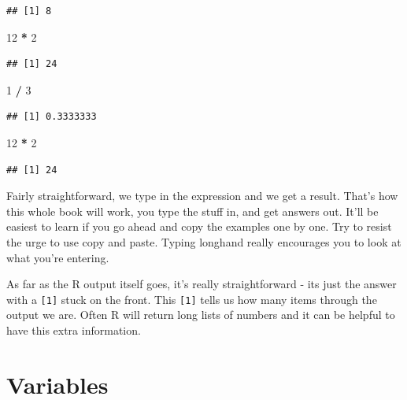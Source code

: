 \documentclass[
]{book}
\newenvironment{Shaded}{\begin{snugshade}}{\end{snugshade}}
\newcommand{\DecValTok}[1]{\textcolor[rgb]{0.00,0.00,0.81}{#1}}
\newcommand{\OperatorTok}[1]{\textcolor[rgb]{0.81,0.36,0.00}{\textbf{#1}}}
\newcommand{\StringTok}[1]{\textcolor[rgb]{0.31,0.60,0.02}{#1}}
\begin{document}
\begin{verbatim}
## [1] 8
\end{verbatim}

\begin{Shaded}
\begin{Highlighting}[]
 \DecValTok{12} \OperatorTok{*}\StringTok{ }\DecValTok{2}
\end{Highlighting}
\end{Shaded}

\begin{verbatim}
## [1] 24
\end{verbatim}

\begin{Shaded}
\begin{Highlighting}[]
 \DecValTok{1} \OperatorTok{/}\StringTok{ }\DecValTok{3}
\end{Highlighting}
\end{Shaded}

\begin{verbatim}
## [1] 0.3333333
\end{verbatim}

\begin{Shaded}
\begin{Highlighting}[]
 \DecValTok{12} \OperatorTok{*}\StringTok{ }\DecValTok{2}
\end{Highlighting}
\end{Shaded}

\begin{verbatim}
## [1] 24
\end{verbatim}

Fairly straightforward, we type in the expression and we get a result. That's how this whole book will work, you type the stuff in, and get answers out. It'll be easiest to learn if you go ahead and copy the examples one by one. Try to resist the urge to use copy and paste. Typing longhand really encourages you to look at what you're entering.

As far as the R output itself goes, it's really straightforward - its just the answer with a \texttt{{[}1{]}} stuck on the front. This \texttt{{[}1{]}} tells us how many items through the output we are. Often R will return long lists of numbers and it can be helpful to have this extra information.

\hypertarget{variables}{%
\section{Variables}\label{variables}}
\end{document}

